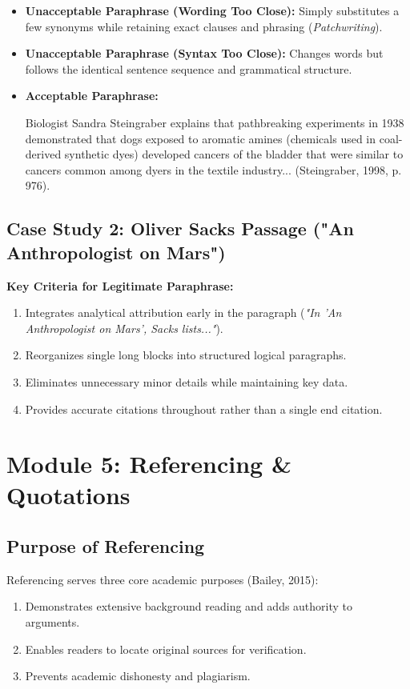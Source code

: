 \documentclass[11pt, a4paper]{article}
\begin{document}
\begin{itemize}
    \item \textbf{Unacceptable Paraphrase (Wording Too Close):} Simply substitutes a few synonyms while retaining exact clauses and phrasing (\textit{Patchwriting}).
    \item \textbf{Unacceptable Paraphrase (Syntax Too Close):} Changes words but follows the identical sentence sequence and grammatical structure.
    \item \textbf{Acceptable Paraphrase:}
    \begin{mdframed}[style=correctbox]
        Biologist Sandra Steingraber explains that pathbreaking experiments in 1938 demonstrated that dogs exposed to aromatic amines (chemicals used in coal-derived synthetic dyes) developed cancers of the bladder that were similar to cancers common among dyers in the textile industry... (Steingraber, 1998, p. 976).
    \end{mdframed}
\end{itemize}

\subsection{Case Study 2: Oliver Sacks Passage ("An Anthropologist on Mars")}
\textbf{Key Criteria for Legitimate Paraphrase:}
\begin{enumerate}
    \item Integrates analytical attribution early in the paragraph (\textit{"In 'An Anthropologist on Mars', Sacks lists..."}).
    \item Reorganizes single long blocks into structured logical paragraphs.
    \item Eliminates unnecessary minor details while maintaining key data.
    \item Provides accurate citations throughout rather than a single end citation.
\end{enumerate}

\newpage

\section{Module 5: Referencing \& Quotations}

\subsection{Purpose of Referencing}
Referencing serves three core academic purposes (Bailey, 2015):
\begin{enumerate}
    \item Demonstrates extensive background reading and adds authority to arguments.
    \item Enables readers to locate original sources for verification.
    \item Prevents academic dishonesty and plagiarism.
\end{enumerate}
\end{document}
